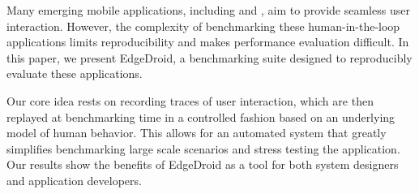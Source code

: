 
Many emerging mobile applications, including  and , aim to provide seamless user interaction.
However, the complexity of benchmarking these human-in-the-loop applications limits reproducibility and makes performance evaluation difficult.
In this paper, we present EdgeDroid, a benchmarking suite designed to reproducibly evaluate these applications.

Our core idea rests on recording traces of user interaction, which are then replayed at benchmarking time in a controlled fashion based on an underlying model of human behavior. 
This allows for an automated system that greatly simplifies benchmarking large scale scenarios and stress testing the application.
Our results show the benefits of EdgeDroid as a tool for both system designers and application developers.
